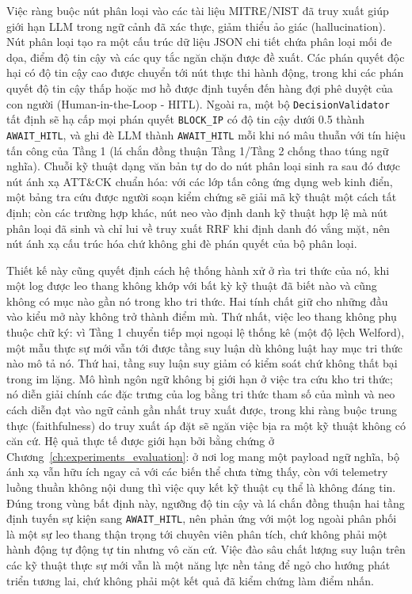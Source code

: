 Việc ràng buộc nút phân loại vào các tài liệu MITRE/NIST đã truy xuất giúp giới hạn LLM trong ngữ cảnh đã xác thực, giảm thiểu ảo giác (hallucination). Nút phân loại tạo ra một cấu trúc dữ liệu JSON chi tiết chứa phân loại mối đe dọa, điểm độ tin cậy và các quy tắc ngăn chặn được đề xuất. Các phán quyết độc hại có độ tin cậy cao được chuyển tới nút thực thi hành động, trong khi các phán quyết độ tin cậy thấp hoặc mơ hồ được định tuyến đến hàng đợi phê duyệt của con người (Human-in-the-Loop - HITL). Ngoài ra, một bộ \texttt{DecisionValidator} tất định sẽ hạ cấp mọi phán quyết \texttt{BLOCK\_IP} có độ tin cậy dưới 0.5 thành \texttt{AWAIT\_HITL}, và ghi đè LLM thành \texttt{AWAIT\_HITL} mỗi khi nó mâu thuẫn với tín hiệu tấn công của Tầng 1 (lá chắn đồng thuận Tầng 1/Tầng 2 chống thao túng ngữ nghĩa). Chuỗi kỹ thuật dạng văn bản tự do do nút phân loại sinh ra sau đó được nút ánh xạ ATT\&CK chuẩn hóa: với các lớp tấn công ứng dụng web kinh điển, một bảng tra cứu được người soạn kiểm chứng sẽ giải mã kỹ thuật một cách tất định; còn các trường hợp khác, nút neo vào định danh kỹ thuật hợp lệ mà nút phân loại đã sinh và chỉ lui về truy xuất RRF khi định danh đó vắng mặt, nên nút ánh xạ cấu trúc hóa chứ không ghi đè phán quyết của bộ phân loại.

Thiết kế này cũng quyết định cách hệ thống hành xử ở rìa tri thức của nó, khi một log được leo thang không khớp với bất kỳ kỹ thuật đã biết nào và cũng không có mục nào gần nó trong kho tri thức. Hai tính chất giữ cho những đầu vào kiểu mở này không trở thành điểm mù. Thứ nhất, việc leo thang không phụ thuộc chữ ký: vì Tầng 1 chuyển tiếp mọi ngoại lệ thống kê (một độ lệch Welford), một mẫu thực sự mới vẫn tới được tầng suy luận dù không luật hay mục tri thức nào mô tả nó. Thứ hai, tầng suy luận suy giảm có kiểm soát chứ không thất bại trong im lặng. Mô hình ngôn ngữ không bị giới hạn ở việc tra cứu kho tri thức; nó diễn giải chính các đặc trưng của log bằng tri thức tham số của mình và neo cách diễn đạt vào ngữ cảnh gần nhất truy xuất được, trong khi ràng buộc trung thực (faithfulness) do truy xuất áp đặt sẽ ngăn việc bịa ra một kỹ thuật không có căn cứ. Hệ quả thực tế được giới hạn bởi bằng chứng ở Chương~\ref{ch:experiments_evaluation}: ở nơi log mang một payload ngữ nghĩa, bộ ánh xạ vẫn hữu ích ngay cả với các biến thể chưa từng thấy, còn với telemetry luồng thuần không nội dung thì việc quy kết kỹ thuật cụ thể là không đáng tin. Đúng trong vùng bất định này, ngưỡng độ tin cậy và lá chắn đồng thuận hai tầng định tuyến sự kiện sang \texttt{AWAIT\_HITL}, nên phản ứng với một log ngoài phân phối là một sự leo thang thận trọng tới chuyên viên phân tích, chứ không phải một hành động tự động tự tin nhưng vô căn cứ. Việc đào sâu chất lượng suy luận trên các kỹ thuật thực sự mới vẫn là một năng lực nền tảng để ngỏ cho hướng phát triển tương lai, chứ không phải một kết quả đã kiểm chứng làm điểm nhấn.

